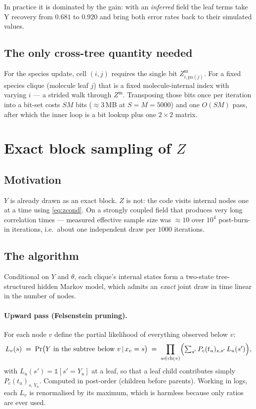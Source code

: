 \documentclass[11pt,a4paper]{article}
\newcommand{\Ys}{Y}
\newcommand{\Zm}{Z^{\mathrm{m}}}
\newcommand{\pa}{\mathrm{pa}}
\newcommand{\ch}{\mathrm{ch}}
\newcommand{\given}{\,\vert\,}
\begin{document}
In practice it is dominated by the gain: with an \emph{inferred} field the leaf terms take Y
recovery from $0.681$ to $0.920$ and bring both error rates back to their simulated values.

\subsection{The only cross-tree quantity needed}

For the species update, cell $(i,j)$ requires the single bit $\Zm_{i,\pa(j)}$. For a fixed
species clique (molecule leaf $j$) that is a fixed molecule-internal index with varying $i$
--- a strided walk through $\Zm$. Transposing those bits once per iteration into a bit-set
costs $SM$ bits ($\approx 3$\,MB at $S=M=5000$) and one $O(SM)$ pass, after which the inner
loop is a bit lookup plus one $2\times2$ matrix.

\section{Exact block sampling of \texorpdfstring{$Z$}{Z}}
\label{sec:block}

\subsection{Motivation}

$\Ys$ is already drawn as an exact block. $Z$ is not: the code visits internal nodes one at
a time using \eqref{eq:zcond}. On a strongly coupled field that produces very long
correlation times --- measured effective sample size was $\approx 10$ over $10^4$
post-burn-in iterations, i.e.\ about one independent draw per $1000$ iterations.

\subsection{The algorithm}

Conditional on $\Ys$ and $\theta$, each clique's internal states form a two-state
tree-structured hidden Markov model, which admits an \emph{exact} joint draw in time linear
in the number of nodes.

\paragraph{Upward pass (Felsenstein pruning).} For each node $v$ define the partial
likelihood of everything observed below $v$:
\[
  L_v(s) \;=\; \Pr\bigl(\Ys \text{ in the subtree below } v \given x_v = s\bigr)
  \;=\;
  \prod_{u \in \ch(v)}
  \Bigl(\textstyle\sum_{s'} P_c(t_u)_{s,s'}\, L_u(s')\Bigr),
\]
with $L_u(s') = \mathbb{1}[s' = \Ys_u]$ at a leaf, so that a leaf child contributes simply
$P_c(t_u)_{s,\,\Ys_u}$. Computed in post-order (children before parents). Working in logs,
each $L_v$ is renormalised by its maximum, which is harmless because only ratios are ever
used.
\end{document}
